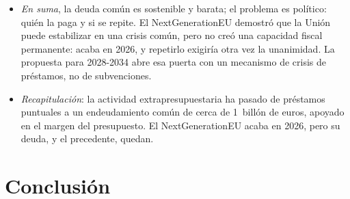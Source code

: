 \documentclass[11pt]{article}
\begin{document}
\begin{itemize}
\item \emph{En suma}, la deuda común es sostenible y barata; el problema es político: quién la paga y si se repite. El NextGenerationEU demostró que la Unión puede estabilizar en una crisis común, pero no creó una capacidad fiscal permanente: acaba en 2026, y repetirlo exigiría otra vez la unanimidad. La propuesta para 2028-2034 abre esa puerta con un mecanismo de crisis de préstamos, no de subvenciones.
\end{itemize}

\begin{itemize}
\item \emph{Recapitulación}: la actividad extrapresupuestaria ha pasado de préstamos puntuales a un endeudamiento común de cerca de 1~billón de euros, apoyado en el margen del presupuesto. El NextGenerationEU acaba en 2026, pero su deuda, y el precedente, quedan.
\end{itemize}

\section*{Conclusión}
\end{document}
